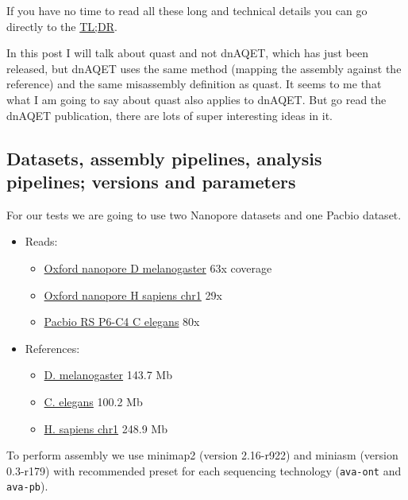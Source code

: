 \documentclass[./main.tex]{subfiles}
\begin{document}
If you have no time to read all these long and technical details you can
go directly to the \protect\hyperlink{take-home-message}{TL;DR}.

In this post I will talk about quast and not dnAQET, which has just been
released, but dnAQET uses the same method (mapping the assembly against
the reference) and the same misassembly definition as quast. It seems to
me that what I am going to say about quast also applies to dnAQET. But
go read the dnAQET publication, there are lots of super interesting
ideas in it.

\subsection{Datasets, assembly pipelines, analysis pipelines; versions
and parameters}

For our tests we are going to use two Nanopore datasets and one Pacbio
dataset.

\begin{itemize}
\item Reads:
  \begin{itemize}
  \item \href{https://www.ebi.ac.uk/ena/data/view/SRX3676783}{Oxford nanopore D melanogaster} 63x coverage
  \item \href{http://s3.amazonaws.com/nanopore-human-wgs/chr1.sorted.bam}{Oxford nanopore H sapiens chr1} 29x
  \item \href{http://datasets.pacb.com.s3.amazonaws.com/2014/c_elegans/list.html}{Pacbio RS P6-C4 C elegans} 80x
  \end{itemize}
\item References:
  \begin{itemize}
  \item \href{https://www.ncbi.nlm.nih.gov/assembly/GCF_000001215.4}{D.
    melanogaster} 143.7 Mb
  \item \href{ftp://ftp.ensembl.org/pub/release-95/fasta/caenorhabditis_elegans/dna/Caenorhabditis_elegans.WBcel235.dna.toplevel.fa.gz}{C.
    elegans} 100.2 Mb
  \item \href{ftp://ftp.ensembl.org/pub/release-95/fasta/homo_sapiens/dna/Homo_sapiens.GRCh38.dna.chromosome.1.fa.gz}{H. sapiens chr1} 248.9 Mb
  \end{itemize}
\end{itemize}

To perform assembly we use minimap2 (version 2.16-r922) and miniasm
(version 0.3-r179) with recommended preset for each sequencing
technology (\texttt{ava-ont} and \texttt{ava-pb}).
\end{document}
